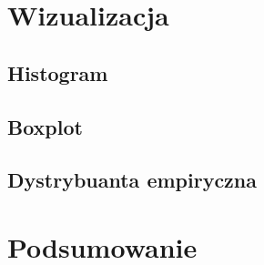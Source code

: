 \documentclass{article}
\theoremstyle{break}
\begin{document}
\section{Wizualizacja}
\subsection{Histogram}
\subsection{Boxplot}
\subsection{Dystrybuanta empiryczna}

\section{Podsumowanie}
\end{document}
